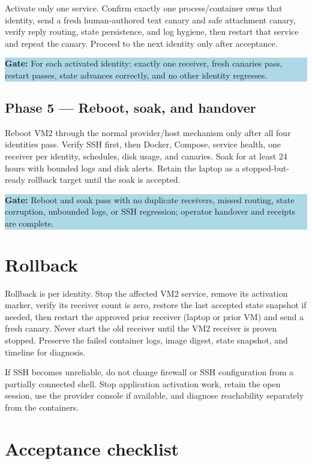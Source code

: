 \documentclass[11pt]{article}
\newcommand{\gate}[1]{\par\medskip\noindent\colorbox{lightblue}{\parbox{0.96\linewidth}{\textbf{Gate:} #1}}\par\medskip}
\begin{document}
Activate only one service. Confirm exactly one process/container owns that identity, send a fresh human-authored text canary and safe attachment canary, verify reply routing, state persistence, and log hygiene, then restart that service and repeat the canary. Proceed to the next identity only after acceptance.

\gate{For each activated identity: exactly one receiver, fresh canaries pass, restart passes, state advances correctly, and no other identity regresses.}

\subsection*{Phase 5 --- Reboot, soak, and handover}
Reboot VM2 through the normal provider/host mechanism only after all four identities pass. Verify SSH first, then Docker, Compose, service health, one receiver per identity, schedules, disk usage, and canaries. Soak for at least 24 hours with bounded logs and disk alerts. Retain the laptop as a stopped-but-ready rollback target until the soak is accepted.

\gate{Reboot and soak pass with no duplicate receivers, missed routing, state corruption, unbounded logs, or SSH regression; operator handover and receipts are complete.}

\section*{Rollback}

Rollback is per identity. Stop the affected VM2 service, remove its activation marker, verify its receiver count is zero, restore the last accepted state snapshot if needed, then restart the approved prior receiver (laptop or prior VM) and send a fresh canary. Never start the old receiver until the VM2 receiver is proven stopped. Preserve the failed container logs, image digest, state snapshot, and timeline for diagnosis.

If SSH becomes unreliable, do not change firewall or SSH configuration from a partially connected shell. Stop application activation work, retain the open session, use the provider console if available, and diagnose reachability separately from the containers.

\section*{Acceptance checklist}
\end{document}
